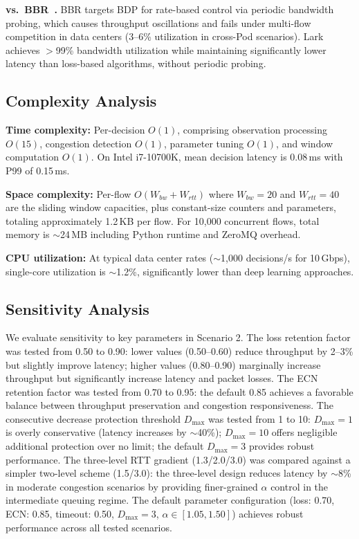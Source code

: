 \documentclass[10pt,twocolumn]{article}
\begin{document}
\textbf{vs.\ BBR~\cite{bbr}.} BBR targets BDP for rate-based control via periodic bandwidth probing, which causes throughput oscillations and fails under multi-flow competition in data centers (3--6\% utilization in cross-Pod scenarios). Lark achieves $>$99\% bandwidth utilization while maintaining significantly lower latency than loss-based algorithms, without periodic probing.

\subsection{Complexity Analysis}

\textbf{Time complexity:} Per-decision $O(1)$, comprising observation processing $O(15)$, congestion detection $O(1)$, parameter tuning $O(1)$, and window computation $O(1)$. On Intel i7-10700K, mean decision latency is 0.08\,ms with P99 of 0.15\,ms.

\textbf{Space complexity:} Per-flow $O(W_{bw} + W_{rtt})$ where $W_{bw} = 20$ and $W_{rtt} = 40$ are the sliding window capacities, plus constant-size counters and parameters, totaling approximately 1.2\,KB per flow. For 10,000 concurrent flows, total memory is $\sim$24\,MB including Python runtime and ZeroMQ overhead.

\textbf{CPU utilization:} At typical data center rates ($\sim$1,000 decisions/s for 10\,Gbps), single-core utilization is $\sim$1.2\%, significantly lower than deep learning approaches.

\subsection{Sensitivity Analysis}

We evaluate sensitivity to key parameters in Scenario 2. The loss retention factor was tested from 0.50 to 0.90: lower values (0.50--0.60) reduce throughput by 2--3\% but slightly improve latency; higher values (0.80--0.90) marginally increase throughput but significantly increase latency and packet losses. The ECN retention factor was tested from 0.70 to 0.95: the default 0.85 achieves a favorable balance between throughput preservation and congestion responsiveness. The consecutive decrease protection threshold $D_{\max}$ was tested from 1 to 10: $D_{\max}=1$ is overly conservative (latency increases by $\sim$40\%); $D_{\max}=10$ offers negligible additional protection over no limit; the default $D_{\max}=3$ provides robust performance. The three-level RTT gradient (1.3/2.0/3.0) was compared against a simpler two-level scheme (1.5/3.0): the three-level design reduces latency by $\sim$8\% in moderate congestion scenarios by providing finer-grained $\alpha$ control in the intermediate queuing regime. The default parameter configuration (loss: 0.70, ECN: 0.85, timeout: 0.50, $D_{\max}=3$, $\alpha \in [1.05, 1.50]$) achieves robust performance across all tested scenarios.
\end{document}
